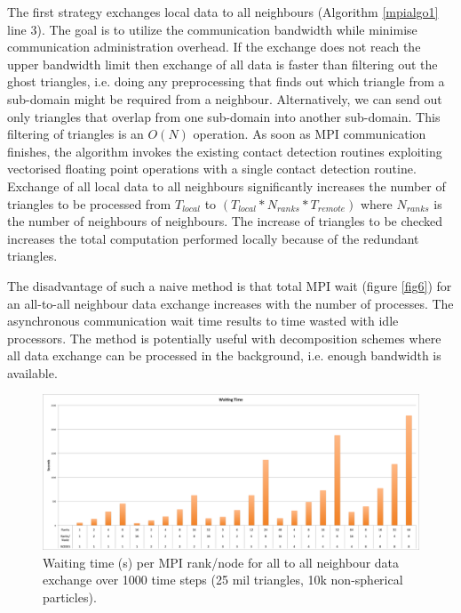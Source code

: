 \documentclass[times,12pt]{article}
\begin{document}
The first strategy exchanges local data to all neighbours (Algorithm \ref{mpialgo1} line 3).  The goal is to utilize the communication bandwidth while minimise communication administration
overhead. If the exchange does not reach the upper bandwidth limit then exchange of all data is faster than filtering out the ghost triangles, i.e. doing any preprocessing that finds out which triangle from a sub-domain might be required from a neighbour. Alternatively, we can send out only triangles
that overlap from one sub-domain into another sub-domain. This filtering of triangles is an $O(N)$ operation. As soon as MPI communication finishes, the algorithm invokes the existing contact
detection routines exploiting vectorised floating point operations with a single contact detection routine. Exchange of all local data to all neighbours significantly increases the number of triangles to be processed from $T_{local}$ to $(T_{local} * N_{ranks} * T_{remote})$ where $N_{ranks}$ is the number of neighbours of neighbours. The increase of triangles to be checked increases the total computation performed locally because of the redundant triangles.

The disadvantage of such a naive method is that total MPI wait (figure \ref{fig6}) for an all-to-all neighbour data exchange increases with the number of processes. The asynchronous communication wait time results to time wasted with idle processors. The method is potentially useful with decomposition schemes where all data exchange can be processed in the background, i.e. enough bandwidth is available.

\begin{figure}[!h]
\centering
\includegraphics[width=1\textwidth]{wait} \protect\caption{\label{waitmpitime}Waiting time (s) per MPI rank/node for all to all neighbour data exchange over 1000 time steps (25 mil triangles, 10k non-spherical particles).}
\end{figure}
\end{document}
